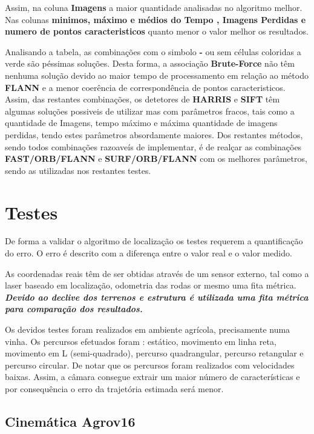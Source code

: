 Assim, na coluna \textbf{Imagens} a maior quantidade analisadas no algoritmo melhor. Nas colunas \textbf{minimos, máximo e médios do Tempo , Imagens Perdidas e numero de pontos caracteristicos} quanto menor o valor melhor os resultados. 

Analisando a tabela, as combinações com o simbolo \textbf{-} ou sem células coloridas a verde são péssimas soluções. Desta forma, a associação \textbf{Brute-Force} não têm nenhuma solução devido ao maior tempo de processamento em relação ao método \textbf{FLANN} e a menor coerência de correspondência de pontos caracteristicos. Assim, das restantes combinações, os detetores de \textbf{HARRIS} e \textbf{SIFT} têm algumas soluções possiveis de utilizar mas com parâmetros fracos, tais como a quantidade de Imagens, tempo máximo e máxima quantidade de imagens perdidas, tendo estes parâmetros absordamente maiores. Dos restantes métodos, sendo todos combinações razoaveís de implementar, é de realçar as combinações \textbf{FAST/ORB/FLANN} e \textbf{SURF/ORB/FLANN} com os melhores parâmetros, sendo as utilizadas nos restantes testes.





\section{Testes}

De forma a validar o algoritmo de localização os testes requerem a quantificação do erro. O erro é descrito com a diferença entre o valor real e o valor medido.

As coordenadas reais têm de ser obtidas através de um sensor externo, tal como a laser baseado em localização, odometria das rodas or mesmo uma fita métrica. \textbf{\textit{Devido ao declive dos terrenos e estrutura é utilizada uma fita métrica para comparação dos resultados.}}

Os devidos testes foram realizados em ambiente agrícola, precisamente numa vinha. Os percursos efetuados foram : estático, movimento em linha reta, movimento em L (semi-quadrado), percurso quadrangular, percurso retangular e percurso circular. De notar que os percursos foram realizados com velocidades baixas. Assim, a câmara consegue extrair um maior número de características e por consequência o erro da trajetória estimada será menor.  


\subsection{Cinemática Agrov16}

